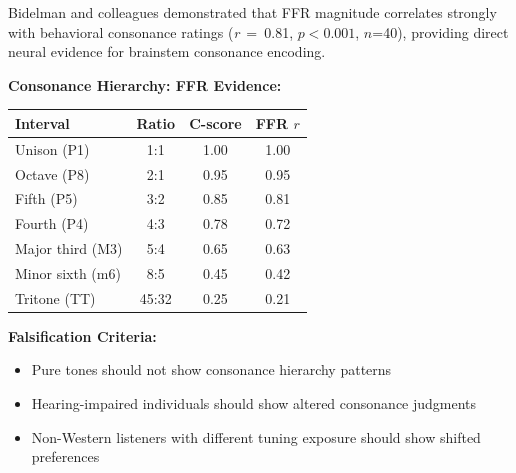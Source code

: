 \documentclass[9pt,onecolumn]{article}
\newcommand{\correlation}[1]{\textit{r}~=~#1}
\begin{document}
Bidelman and colleagues demonstrated that FFR magnitude correlates strongly with behavioral consonance ratings (\correlation{0.81}, $p<0.001$, $n$=40), providing direct neural evidence for brainstem consonance encoding.

\textbf{Consonance Hierarchy: FFR Evidence:}
\begin{center}
\small
\begin{tabular}{@{}lccc@{}}
\toprule
\textbf{Interval} & \textbf{Ratio} & \textbf{C-score} & \textbf{FFR $r$} \\
\midrule
Unison (P1) & 1:1 & 1.00 & 1.00 \\
Octave (P8) & 2:1 & 0.95 & 0.95 \\
Fifth (P5) & 3:2 & 0.85 & 0.81 \\
Fourth (P4) & 4:3 & 0.78 & 0.72 \\
Major third (M3) & 5:4 & 0.65 & 0.63 \\
Minor sixth (m6) & 8:5 & 0.45 & 0.42 \\
Tritone (TT) & 45:32 & 0.25 & 0.21 \\
\bottomrule
\end{tabular}
\end{center}

\textbf{Falsification Criteria:}
\begin{itemize}[leftmargin=*, topsep=0pt, itemsep=0pt]
\item Pure tones should not show consonance hierarchy patterns
\item Hearing-impaired individuals should show altered consonance judgments
\item Non-Western listeners with different tuning exposure should show shifted preferences
\end{itemize}
\end{document}

